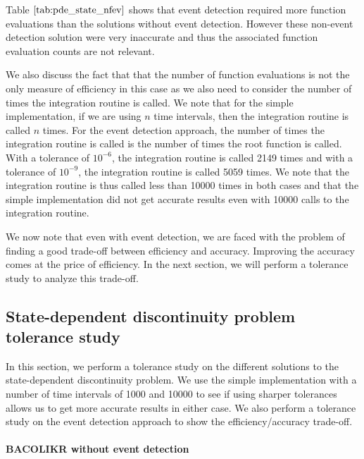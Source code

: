 Table $\ref{tab:pde_state_nfev}$ shows that event detection required more function evaluations than the solutions without event detection. However these non-event detection solution were very inaccurate and thus the associated function evaluation counts are not relevant. 

We also discuss the fact that that the number of function evaluations is not the only measure of efficiency in this case as we also need to consider the number of times the integration routine is called. We note that for the simple implementation, if we are using $n$ time intervals, then the integration routine is called $n$ times. For the event detection approach, the number of times the integration routine is called is the number of times the root function is called. With a tolerance of $10^{-6}$, the integration routine is called 2149 times and with a tolerance of $10^{-9}$, the integration routine is called 5059 times. We note that the integration routine is thus called less than 10000 times in both cases and that the simple implementation did not get accurate results even with 10000 calls to the integration routine.

We now note that even with event detection, we are faced with the problem of finding a good trade-off between efficiency and accuracy. Improving the accuracy comes at the price of efficiency. In the next section, we will perform a tolerance study to analyze this trade-off.

\subsection{State-dependent discontinuity problem tolerance study}
\label{subsubsection:pde_state_tol_study}
In this section, we perform a tolerance study on the different solutions to the state-dependent discontinuity problem. We use the simple implementation with a number of time intervals of 1000 and 10000 to see if using sharper tolerances allows us to get more accurate results in either case. We also perform a tolerance study on the event detection approach to show the efficiency/accuracy trade-off.

\paragraph{BACOLIKR without event detection}

